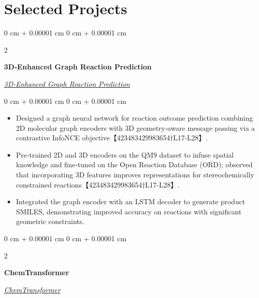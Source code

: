 \documentclass[10pt, letterpaper]{article}
\newenvironment{highlights}{
    \begin{itemize}[
        topsep=0.10 cm,
        parsep=0.10 cm,
        partopsep=0pt,
        itemsep=0pt,
        leftmargin=0 cm + 10pt
    ]
}{
    \end{itemize}
} %
\newenvironment{onecolentry}{
    \begin{adjustwidth}{
        0 cm + 0.00001 cm
    }{
        0 cm + 0.00001 cm
    }
}{
    \end{adjustwidth}
} %
\newenvironment{twocolentry}[2][]{
    \onecolentry
    \def\secondColumn{#2}
    \setcolumnwidth{\fill, 4.5 cm}
    \begin{paracol}{2}
}{
    \switchcolumn \raggedleft \secondColumn
    \end{paracol}
    \endonecolentry
} %
\begin{document}
    \section{Selected Projects}

    \begin{twocolentry}{\textit{\href{https://aaronzhfeng.github.io/projects/3d-enhanced-graph-reaction}{3D‑Enhanced Graph Reaction Prediction}}}
        \textbf{3D‑Enhanced Graph Reaction Prediction}
    \end{twocolentry}

    \vspace{0.10 cm}
    \begin{onecolentry}
        \begin{highlights}
            \item Designed a graph neural network for reaction outcome prediction combining 2D molecular graph encoders with 3D geometry‑aware message passing via a contrastive InfoNCE objective【423483429983654†L17-L28】.
            \item Pre‑trained 2D and 3D encoders on the QM9 dataset to infuse spatial knowledge and fine‑tuned on the Open Reaction Database (ORD); observed that incorporating 3D features improves representations for stereochemically constrained reactions【423483429983654†L17-L28】.
            \item Integrated the graph encoder with an LSTM decoder to generate product SMILES, demonstrating improved accuracy on reactions with significant geometric constraints.
        \end{highlights}
    \end{onecolentry}

    \vspace{0.2 cm}

    \begin{twocolentry}{\textit{\href{https://aaronzhfeng.github.io/projects/chemtransformer}{ChemTransformer}}}
        \textbf{ChemTransformer}
    \end{twocolentry}
\end{document}
